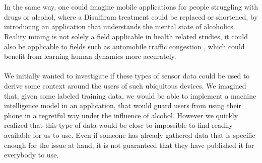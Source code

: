 \\\\
In the same way, one could imagine mobile applications for people struggling with drugs or alcohol, where a Disulfiram treatment \parencite{nlm_disulfiram} could be replaced or shortened, by introducing an application that understands the mental state of alcoholics. Reality mining is not solely a field applicable in health related studies, it could also be applicable to fields such as automobile traffic congestion \parencite{pentland2009reality_mining_mobile_communication_gps}, which could benefit from learning human dynamics more accurately.
\\\\
We initially wanted to investigate if these types of sensor data could be used to derive some context around the users of such ubiquitous devices. We imagined that, given some labeled training data, we would be able to implement a machine intelligence model in an application, that would guard users from using their phone in a regretful way under the influence of alcohol. However we quickly realized that this type of data would be close to impossible to find readily available for us to use. Even if someone has already gathered data that is specific enough for the issue at hand, it is not guaranteed that they have published it for everybody to use.
